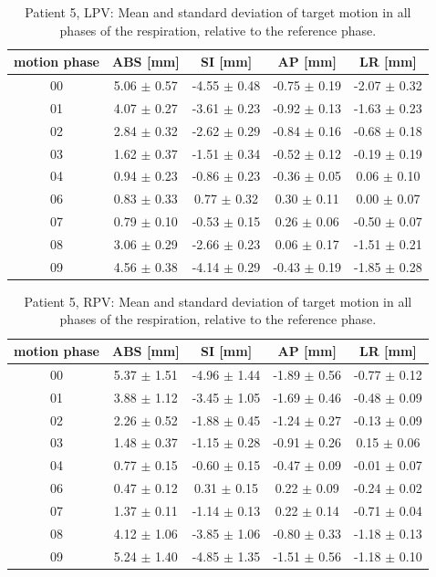 \documentclass[type=dr, dr=rernat, accentcolor=tud7b,colorbacktitle, bigchapter, openright, twoside, 12pt ]{tudthesis}
\begin{document}

\begin{table}[H]
  \centering
  \caption{Patient 5, LPV: Mean and standard deviation of target motion in all phases of the respiration, relative to the reference phase.}
  \begin{tabular}{|c|c|c|c|c|}
    \hline\hline
    motion phase & ABS [mm] & SI [mm] & AP [mm] & LR [mm]\\
    \hline 
00& 5.06 $\pm$ 0.57& -4.55 $\pm$ 0.48& -0.75 $\pm$ 0.19& -2.07 $\pm$ 0.32 \\
01& 4.07 $\pm$ 0.27& -3.61 $\pm$ 0.23& -0.92 $\pm$ 0.13& -1.63 $\pm$ 0.23 \\
02& 2.84 $\pm$ 0.32& -2.62 $\pm$ 0.29& -0.84 $\pm$ 0.16& -0.68 $\pm$ 0.18 \\
03& 1.62 $\pm$ 0.37& -1.51 $\pm$ 0.34& -0.52 $\pm$ 0.12& -0.19 $\pm$ 0.19 \\
04& 0.94 $\pm$ 0.23& -0.86 $\pm$ 0.23& -0.36 $\pm$ 0.05& 0.06 $\pm$ 0.10 \\
06& 0.83 $\pm$ 0.33& 0.77 $\pm$ 0.32& 0.30 $\pm$ 0.11& 0.00 $\pm$ 0.07 \\
07& 0.79 $\pm$ 0.10& -0.53 $\pm$ 0.15& 0.26 $\pm$ 0.06& -0.50 $\pm$ 0.07 \\
08& 3.06 $\pm$ 0.29& -2.66 $\pm$ 0.23& 0.06 $\pm$ 0.17& -1.51 $\pm$ 0.21 \\
09& 4.56 $\pm$ 0.38& -4.14 $\pm$ 0.29& -0.43 $\pm$ 0.19& -1.85 $\pm$ 0.28 \\
        \hline\hline
  \end{tabular}
\end{table}

\begin{table}[H]
  \centering
  \caption{Patient 5, RPV: Mean and standard deviation of target motion in all phases of the respiration, relative to the reference phase.}
  \begin{tabular}{|c|c|c|c|c|}
    \hline\hline
    motion phase & ABS [mm] & SI [mm] & AP [mm] & LR [mm]\\
    \hline 
00& 5.37 $\pm$ 1.51& -4.96 $\pm$ 1.44& -1.89 $\pm$ 0.56& -0.77 $\pm$ 0.12 \\
01& 3.88 $\pm$ 1.12& -3.45 $\pm$ 1.05& -1.69 $\pm$ 0.46& -0.48 $\pm$ 0.09 \\
02& 2.26 $\pm$ 0.52& -1.88 $\pm$ 0.45& -1.24 $\pm$ 0.27& -0.13 $\pm$ 0.09 \\
03& 1.48 $\pm$ 0.37& -1.15 $\pm$ 0.28& -0.91 $\pm$ 0.26& 0.15 $\pm$ 0.06 \\
04& 0.77 $\pm$ 0.15& -0.60 $\pm$ 0.15& -0.47 $\pm$ 0.09& -0.01 $\pm$ 0.07 \\
06& 0.47 $\pm$ 0.12& 0.31 $\pm$ 0.15& 0.22 $\pm$ 0.09& -0.24 $\pm$ 0.02 \\
07& 1.37 $\pm$ 0.11& -1.14 $\pm$ 0.13& 0.22 $\pm$ 0.14& -0.71 $\pm$ 0.04 \\
08& 4.12 $\pm$ 1.06& -3.85 $\pm$ 1.06& -0.80 $\pm$ 0.33& -1.18 $\pm$ 0.13 \\
09& 5.24 $\pm$ 1.40& -4.85 $\pm$ 1.35& -1.51 $\pm$ 0.56& -1.18 $\pm$ 0.10 \\
        \hline\hline
  \end{tabular}
\end{table}
\end{document}
